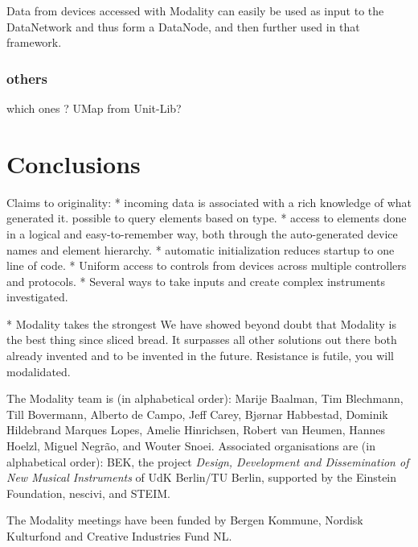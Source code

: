 \documentclass{article}
\begin{document}
Data from devices accessed with Modality can easily be used as input to the DataNetwork and thus form a DataNode, and then further used in that framework.

\subsubsection{others}

which ones ? UMap from Unit-Lib?


\section{Conclusions}
\label{sec:conclusions}


Claims to originality:
* incoming data is associated with a rich knowledge of what generated it. possible to query elements based on type.
* access to elements done in a logical and easy-to-remember way, both through the auto-generated device names and element hierarchy.
* automatic initialization reduces startup to one line of code.
* Uniform access to controls from devices across multiple controllers and protocols.
* Several ways to take inputs and create complex instruments investigated.

* Modality takes the strongest
We have showed beyond doubt that Modality is the best thing since sliced bread. It surpasses all other solutions out there both already invented and to be invented in the future. Resistance is futile, you will modalidated.


\begin{acknowledgments}
The Modality team is (in alphabetical order):
    Marije Baalman,
    Tim Blechmann,
    Till Bovermann,
    Alberto de Campo,
    Jeff Carey,
    Bj\o{}rnar Habbestad,
    Dominik Hildebrand Marques Lopes,
    Amelie Hinrichsen,
    Robert van Heumen,
    Hannes Hoelzl,
    Miguel Negr\~{a}o, and
    Wouter Snoei.
Associated organisations are (in alphabetical order):
BEK,
the project \emph{Design, Development and Dissemination of New Musical Instruments} of UdK Berlin/TU Berlin, supported by the Einstein Foundation,
nescivi, and
STEIM.

The Modality meetings have been funded by Bergen Kommune, Nordisk Kulturfond and Creative Industries Fund NL.


\end{acknowledgments} 


\end{document}
